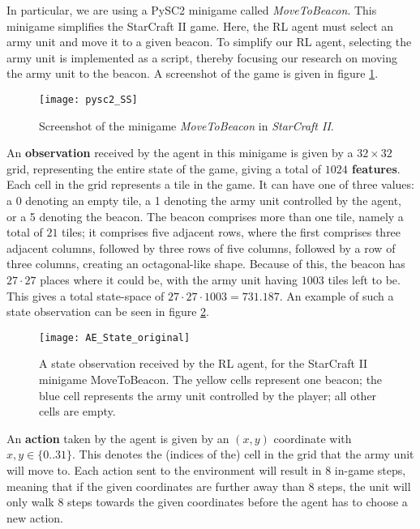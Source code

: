 In particular, we are using a PySC2 minigame called \emph{MoveToBeacon}. This minigame simplifies the StarCraft II game. Here, the RL agent must select an army unit and move it to a given beacon. To simplify our RL agent, selecting the army unit is implemented as a script, thereby focusing our research on moving the army unit to the beacon. A screenshot of the game is given in figure \ref{fig:pysc2_SS}. 

\begin{figure}[h]
    \centering
    \texttt{[image: pysc2\_SS]}
    \caption{Screenshot of the minigame \emph{MoveToBeacon} in \emph{StarCraft II}.}
    \label{fig:pysc2_SS}
\end{figure}

An \textbf{observation} received by the agent in this minigame is given by a $32 \times 32$ grid, representing the entire state of the game, giving a total of \textbf{$1024$ features}. Each cell in the grid represents a tile in the game. It can have one of three values: a 0 denoting an empty tile, a 1 denoting the army unit controlled by the agent, or a 5 denoting the beacon. The beacon comprises more than one tile, namely a total of $21$ tiles; it comprises five adjacent rows, where the first comprises three adjacent columns, followed by three rows of five columns, followed by a row of three columns, creating an octagonal-like shape. Because of this, the beacon has $27 \cdot 27$ places where it could be, with the army unit having $1003$ tiles left to be. This gives a total state-space of $27 \cdot 27 \cdot 1003 = 731.187$. An example of such a state observation can be seen in figure \ref{fig:state_example}.

\begin{figure}[h]
    \centering
    \texttt{[image: AE\_State\_original]}
    \caption{A state observation received by the RL agent, for the StarCraft II minigame MoveToBeacon. The yellow cells represent one beacon; the blue cell represents the army unit controlled by the player; all other cells are empty.}
    \label{fig:state_example}
\end{figure}

An \textbf{action} taken by the agent is given by an $(x,y)$ coordinate with $x,y \in \{0 .. 31\}$. This denotes the (indices of the) cell in the grid that the army unit will move to. Each action sent to the environment will result in $8$ in-game steps, meaning that if the given coordinates are further away than 8 steps, the unit will only walk 8 steps towards the given coordinates before the agent has to choose a new action.

